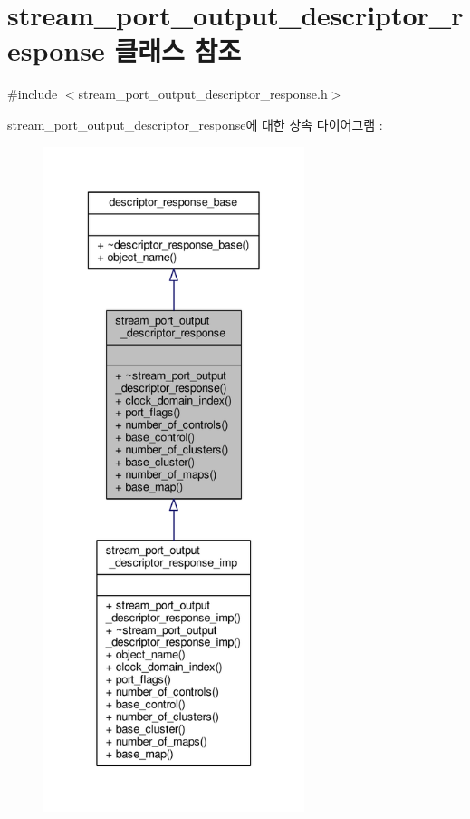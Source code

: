 \hypertarget{classavdecc__lib_1_1stream__port__output__descriptor__response}{}\section{stream\+\_\+port\+\_\+output\+\_\+descriptor\+\_\+response 클래스 참조}
\label{classavdecc__lib_1_1stream__port__output__descriptor__response}


{\ttfamily \#include $<$stream\+\_\+port\+\_\+output\+\_\+descriptor\+\_\+response.\+h$>$}



stream\+\_\+port\+\_\+output\+\_\+descriptor\+\_\+response에 대한 상속 다이어그램 \+: 
\nopagebreak
\begin{figure}[H]
\begin{center}
\leavevmode
\includegraphics[height=550pt]{classavdecc__lib_1_1stream__port__output__descriptor__response__inherit__graph}
\end{center}
\end{figure}


